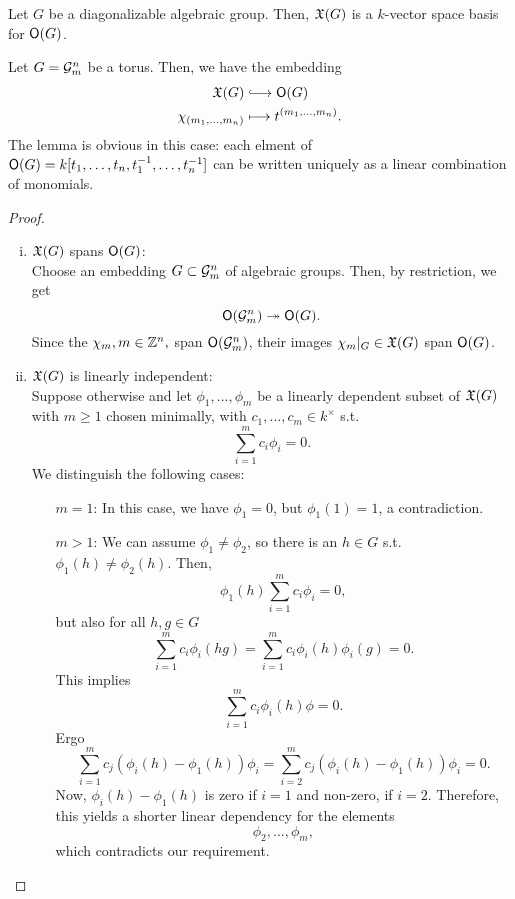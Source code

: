 \begin{lemma}
Let $G$ be a diagonalizable algebraic group. Then, $\mathfrak{X}(G)$ is a $k$-vector space basis for $\mathsf{O}(G)$.
\end{lemma}
\begin{example}
Let $G = \mathcal{G}_m^n$ be a torus. Then, we have the embedding
\begin{align*}
\X(G) &\Inj{} \O(G)\\
\chi_{(m_1,\ldots, m_n)} & \longmapsto t^{(m_1,\ldots, m_n)}.
\end{align*}
The lemma is obvious in this case: each elment of $\mathsf{O}(G) = k [t_1,\ldots, t_n, t_1^{-1}, \ldots, t_n^{-1}]$ can be written uniquely as a linear combination of monomials.
\end{example}
\begin{proof}
\begin{enumerate}[(i)]
	\item $\mathfrak{X}(G)$ spans $\mathsf{O}(G)$:\\
	Choose an embedding $G \subset \mathcal{G}_m^n$ of algebraic groups. Then, by restriction, we get
	\[ \mathsf{O}(\mathcal{G}^n_m) \overset{}{\twoheadrightarrow} \mathsf{O}(G). \]
	Since the $\chi_m, m \in \mathbb{Z}^n, $ span $\mathsf{O}(\mathcal{G}_m^n)$, their images $\chi_m|_G \in \mathfrak{X}(G)$ span $\mathsf{O}(G)$.
	\item $\mathfrak{X}(G)$ is linearly independent:\\
	Suppose otherwise and let $\phi_1, \ldots, \phi_m$ be a linearly dependent subset of $\mathfrak{X}(G)$ with $m \geq 1$ chosen minimally, with $c_1, \ldots, c_m \in k^\times$ s.t.
	\[ \sum_{i = 1}^m c_i \phi_i = 0. \]
	We distinguish the following cases:
	\begin{enumerate}
		\item[$m = 1$:] In this case, we have $\phi_1 = 0$, but $\phi_1(1) = 1$, a contradiction.
		\item[$m > 1$:] We can assume $\phi_1 \neq \phi_2$, so there is an $h \in G$ s.t. $\phi_1(h) \neq \phi_2(h)$. Then,
		\[ \phi_1(h) \sum_{i=1}^m c_i \phi_i = 0, \]
		but also for all $h,g \in G$
		\[ \sum_{i = 1}^mc_i \phi_i(hg) =\sum_{i = 1}^mc_i \phi_i(h)\phi_i(g) = 0. \]
		This implies
		\[ \sum_{i = 1}^m c_i\phi_i(h) \phi = 0. \]
		Ergo
		\[ \sum_{i= 1}^m c_j(\phi_i(h) - \phi_1(h)) \phi_i = \sum_{i= 2}^m c_j(\phi_i(h) - \phi_1(h)) \phi_i = 0. \]
		Now, $\phi_i(h) - \phi_1(h)$ is zero if $i = 1$ and non-zero, if $i = 2$. Therefore, this yields a shorter linear dependency for the elements
		\[ \phi_2, \ldots, \phi_m, \]
		which contradicts our requirement.
	\end{enumerate}
\end{enumerate}
\end{proof}

